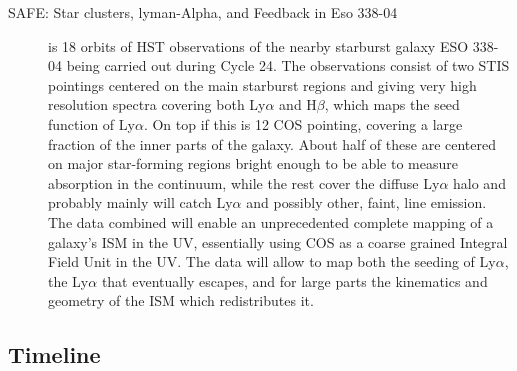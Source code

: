 \documentclass[12pt]{amsart}
\begin{document}
\begin{description}
	\item[SAFE: Star clusters, lyman-Alpha, and Feedback in Eso 338-04] is 
		18 orbits of HST observations of the nearby starburst galaxy ESO
		338-04 being carried out during Cycle 24. The observations
		consist of two STIS pointings centered on the main starburst
		regions and giving very high resolution spectra covering both
		Ly$\alpha$ and H$\beta$, which maps the seed function of
		Ly$\alpha$. On top if this is 12 COS pointing, covering a large
		fraction of the inner parts of the galaxy. About half of these
		are centered on major star-forming regions bright enough to be
		able to measure absorption in the continuum, while the rest
		cover the diffuse Ly$\alpha$ halo and probably mainly will catch
		Ly$\alpha$ and possibly other, faint, line emission. The data
		combined will enable an unprecedented complete mapping of a
		galaxy's ISM in the UV, essentially using COS as a coarse
		grained Integral Field Unit in the UV. The data will allow to
		map both the seeding of Ly$\alpha$, the Ly$\alpha$ that
		eventually escapes, and for large parts the kinematics and
		geometry of the ISM which redistributes it. 
\end{description}

\subsection{Timeline}
\end{document}
